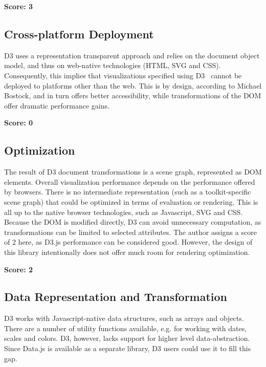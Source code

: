 \SuperPar \textbf{Score: 3}

\subsection{Cross-platform Deployment}

D3 uses a representation transparent approach and relies on the document object model, and thus on web-native technologies (HTML, SVG and CSS). Consequently, this implies that visualizations specified using D3~\cite{D3} cannot be deployed to platforms other than the web. This is by design, according to Michael Bostock, and in turn offers better accessibility, while transformations of the DOM offer dramatic performance gains.

\SuperPar \textbf{Score: 0}

\subsection{Optimization}

The result of D3 document transformations is a scene graph, represented as DOM elements. Overall visualization performance depends on the performance offered by browsers. There is no intermediate representation (such as a toolkit-specific scene graph) that could be optimized in terms of evaluation or rendering. This is all up to the native browser technologies, such as Javascript, SVG and CSS. Because the DOM is modified directly, D3 can avoid unnecessary computation, as transformations can be limited to selected attributes. The author assigns a score of 2 here, as D3.js performance can be considered good. However, the design of this library intentionally does not offer much room for rendering optimization.

\SuperPar \textbf{Score: 2}

\subsection{Data Representation and Transformation}

D3 works with Javascript-native data structures, such as arrays and objects. There are a number of utility functions available, e.g. for working with dates, scales and colors. D3, however, lacks support for higher level data-abstraction. Since Data.js is available as a separate library, D3 users could use it to fill this gap.

